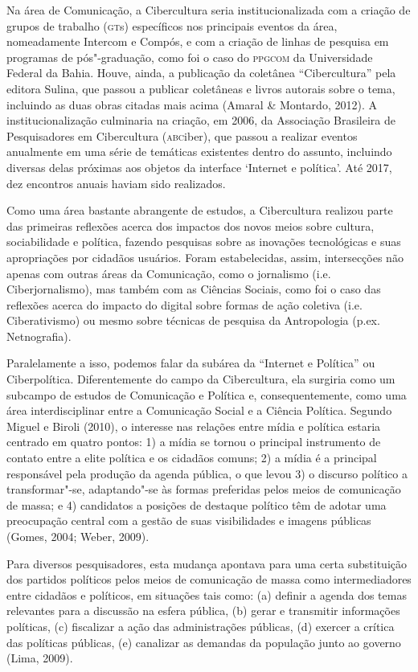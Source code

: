 Na área de Comunicação, a Cibercultura seria institucionalizada com a
criação de grupos de trabalho (\textsc{gt}s) específicos nos principais eventos
da área, nomeadamente Intercom e Compós, e com a criação de linhas de
pesquisa em programas de pós"-graduação, como foi o caso do \textsc{ppgcom} da
Universidade Federal da Bahia. Houve, ainda, a publicação da coletânea
``Cibercultura'' pela editora Sulina, que passou a publicar coletâneas e
livros autorais sobre o tema, incluindo as duas obras citadas mais acima
(Amaral \& Montardo, 2012). A institucionalização culminaria na criação,
em 2006, da Associação Brasileira de Pesquisadores em Cibercultura
(\textsc{abc}iber), que passou a realizar eventos anualmente em uma série de
temáticas existentes dentro do assunto, incluindo diversas delas
próximas aos objetos da interface `Internet e política'. Até 2017, dez
encontros anuais haviam sido realizados.

Como uma área bastante abrangente de estudos, a Cibercultura realizou
parte das primeiras reflexões acerca dos impactos dos novos meios sobre
cultura, sociabilidade e política, fazendo pesquisas sobre as inovações
tecnológicas e suas apropriações por cidadãos usuários. Foram
estabelecidas, assim, intersecções não apenas com outras áreas da
Comunicação, como o jornalismo (i.e. Ciberjornalismo), mas também com as
Ciências Sociais, como foi o caso das reflexões acerca do impacto do
digital sobre formas de ação coletiva (i.e. Ciberativismo) ou mesmo
sobre técnicas de pesquisa da Antropologia (p.ex. Netnografia).

Paralelamente a isso, podemos falar da subárea da ``Internet e
Política'' ou Ciberpolítica. Diferentemente do campo da Cibercultura,
ela surgiria como um subcampo de estudos de Comunicação e Política e,
consequentemente, como uma área interdisciplinar entre a Comunicação
Social e a Ciência Política. Segundo Miguel e Biroli (2010), o interesse
nas relações entre mídia e política estaria centrado em quatro pontos:
1) a mídia se tornou o principal instrumento de contato entre a elite
política e os cidadãos comuns; 2) a mídia é a principal responsável pela
produção da agenda pública, o que levou 3) o discurso político a
transformar"-se, adaptando"-se às formas preferidas pelos meios de
comunicação de massa; e 4) candidatos a posições de destaque político
têm de adotar uma preocupação central com a gestão de suas visibilidades
e imagens públicas (Gomes, 2004; Weber, 2009).

Para diversos pesquisadores, esta mudança apontava para uma certa
substituição dos partidos políticos pelos meios de comunicação de massa
como intermediadores entre cidadãos e políticos, em situações tais como:
(a) definir a agenda dos temas relevantes para a discussão na esfera
pública, (b) gerar e transmitir informações políticas, (c) fiscalizar a
ação das administrações públicas, (d) exercer a crítica das políticas
públicas, (e) canalizar as demandas da população junto ao governo (Lima,
2009).

